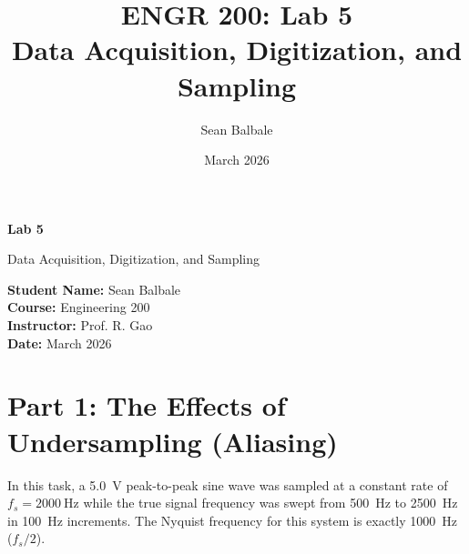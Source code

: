 \documentclass[11pt]{article}
\title{\textbf{ENGR 200: Lab 5}\\
Data Acquisition, Digitization, and Sampling}
\author{Sean Balbale}
\date{March 2026}
\begin{document}
\begin{titlepage}
  \begin{center}
    \vspace*{1in}

    \Huge
    \textbf{Lab 5}

    \LARGE
    Data Acquisition, Digitization, and Sampling

    \vspace{3in}

    \textbf{Student Name:} Sean Balbale
    \\ \textbf{Course:} Engineering 200
    \\ \textbf{Instructor:} Prof. R. Gao
    \\ \textbf{Date:} March 2026

    \vfill

  \end{center}
\end{titlepage}

\newpage

\section*{Part 1: The Effects of Undersampling (Aliasing)}

In this task, a \SI{5.0}{\volt} peak-to-peak sine wave was sampled at a constant rate of $f_s = \SI{2000}{\hertz}$ while the true signal frequency was swept from \SI{500}{\hertz} to \SI{2500}{\hertz} in \SI{100}{\hertz} increments. The Nyquist frequency for this system is exactly \SI{1000}{\hertz} ($f_s / 2$).

\begin{table}[H]
  \centering
  \caption{Complete Theoretical Alias Frequency Predictions ($f_s = 2000$ Hz)}


\end{table}
\end{document}
